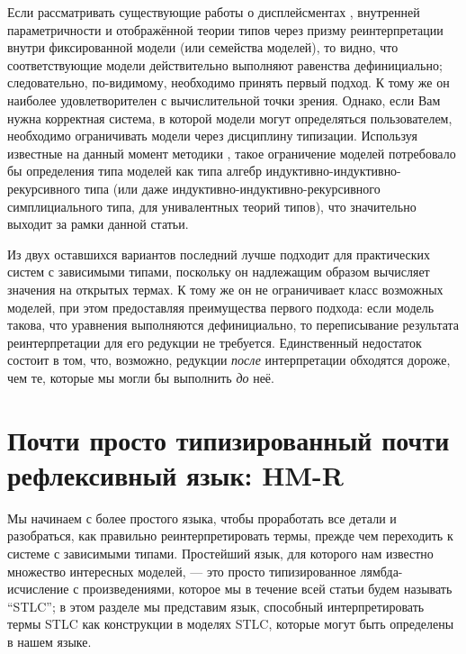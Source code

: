 Если рассматривать существующие работы о дисплейсментах
\cite{McBride:Crude2011,McBride:Crude2012}, внутренней
параметричности \cite{Altenkirch:Parametricity2024} и
отображённой теории типов
\cite{Kolomatskaia_Shulman_2025} через призму
реинтерпретации внутри фиксированной модели (или
семейства моделей), то видно, что соответствующие
модели действительно выполняют равенства дефинициально;
следовательно, по-видимому, необходимо принять первый
подход. К тому же он наиболее удовлетворителен с
вычислительной точки зрения. Однако, если Вам нужна
корректная система, в которой модели могут определяться
пользователем, необходимо ограничивать модели через
дисциплину типизации. Используя известные на данный
момент методики
\cite{bezem2021notegeneralizedalgebraictheories},
такое ограничение моделей потребовало бы определения
типа моделей как типа алгебр
индуктивно-индуктивно-рекурсивного типа (или даже
индуктивно-индуктивно-рекурсивного симплициального
типа, для унивалентных теорий типов), что значительно
выходит за рамки данной статьи.

Из двух оставшихся вариантов последний лучше подходит
для практических систем с зависимыми типами, поскольку
он надлежащим образом вычисляет значения на открытых
термах. К тому же он не ограничивает класс возможных
моделей, при этом предоставляя преимущества первого
подхода: если модель такова, что уравнения выполняются
дефинициально, то переписывание результата
реинтерпретации для его редукции не требуется.
Единственный недостаток состоит в том, что, возможно,
редукции \textit{после} интерпретации обходятся дороже,
чем те, которые мы могли бы выполнить \textit{до} неё.

\section
{Почти просто типизированный почти рефлексивный язык:
HM-R}\label{HM-R}

Мы начинаем с более простого языка, чтобы проработать
все детали и разобраться, как правильно
реинтерпретировать термы, прежде чем переходить к
системе с зависимыми типами. Простейший язык, для
которого нам известно множество интересных моделей, ---
это просто типизированное лямбда-исчисление с
произведениями, которое мы в течение всей статьи будем
называть ``STLC''; в этом разделе мы представим язык,
способный интерпретировать термы STLC как конструкции в
моделях STLC, которые могут быть определены в нашем
языке.

